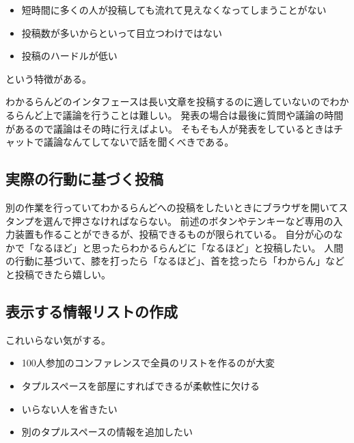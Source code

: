\begin{itemize}
\item 短時間に多くの人が投稿しても流れて見えなくなってしまうことがない
\item 投稿数が多いからといって目立つわけではない
\item 投稿のハードルが低い
\end{itemize}
という特徴がある。

わかるらんどのインタフェースは長い文章を投稿するのに適していないのでわかるらんど上で議論を行うことは難しい。
発表の場合は最後に質問や議論の時間があるので議論はその時に行えばよい。
そもそも人が発表をしているときはチャットで議論なんてしてないで話を聞くべきである。

\subsection{実際の行動に基づく投稿}

別の作業を行っていてわかるらんどへの投稿をしたいときにブラウザを開いてスタンプを選んで押さなければならない。
前述のボタンやテンキーなど専用の入力装置も作ることができるが、投稿できるものが限られている。
自分が心のなかで「なるほど」と思ったらわかるらんどに「なるほど」と投稿したい。
人間の行動に基づいて、膝を打ったら「なるほど」、首を捻ったら「わからん」などと投稿できたら嬉しい。

\subsection{表示する情報リストの作成}

これいらない気がする。

\begin{itemize}
\item 100人参加のコンファレンスで全員のリストを作るのが大変
\item タプルスペースを部屋にすればできるが柔軟性に欠ける
\item いらない人を省きたい
\item 別のタプルスペースの情報を追加したい
\end{itemize}